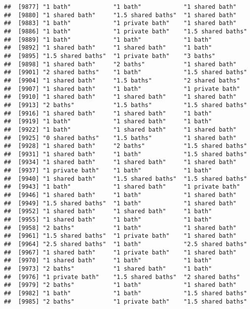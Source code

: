 \documentclass[
]{article}
\begin{document}
\begin{verbatim}
##  [9877] "1 bath"            "1 bath"            "1 shared bath"    
##  [9880] "1 shared bath"     "1.5 shared baths"  "1 shared bath"    
##  [9883] "1 bath"            "1 private bath"    "1 shared bath"    
##  [9886] "1 bath"            "1 private bath"    "1.5 shared baths" 
##  [9889] "1 bath"            "1 bath"            "1 bath"           
##  [9892] "1 shared bath"     "1 shared bath"     "1 bath"           
##  [9895] "1.5 shared baths"  "1 private bath"    "3 baths"          
##  [9898] "1 shared bath"     "2 baths"           "1 shared bath"    
##  [9901] "2 shared baths"    "1 bath"            "1.5 shared baths" 
##  [9904] "1 shared bath"     "1.5 baths"         "2 shared baths"   
##  [9907] "1 shared bath"     "1 bath"            "1 private bath"   
##  [9910] "1 shared bath"     "1 shared bath"     "1 shared bath"    
##  [9913] "2 baths"           "1.5 baths"         "1.5 shared baths" 
##  [9916] "1 shared bath"     "1 shared bath"     "1 bath"           
##  [9919] "1 bath"            "1 shared bath"     "1 bath"           
##  [9922] "1 bath"            "1 shared bath"     "1 shared bath"    
##  [9925] "0 shared baths"    "1.5 baths"         "1 shared bath"    
##  [9928] "1 shared bath"     "2 baths"           "1.5 shared baths" 
##  [9931] "1 shared bath"     "1 bath"            "1.5 shared baths" 
##  [9934] "1 shared bath"     "1 shared bath"     "1 shared bath"    
##  [9937] "1 private bath"    "1 bath"            "1 bath"           
##  [9940] "1 shared bath"     "1.5 shared baths"  "1.5 shared baths" 
##  [9943] "1 bath"            "1 shared bath"     "1 private bath"   
##  [9946] "1 shared bath"     "1 bath"            "1 shared bath"    
##  [9949] "1.5 shared baths"  "1 bath"            "1 shared bath"    
##  [9952] "1 shared bath"     "1 shared bath"     "1 bath"           
##  [9955] "1 shared bath"     "1 bath"            "1 bath"           
##  [9958] "2 baths"           "1 bath"            "1 shared bath"    
##  [9961] "1.5 shared baths"  "1 private bath"    "1 shared bath"    
##  [9964] "2.5 shared baths"  "1 bath"            "2.5 shared baths" 
##  [9967] "1 shared bath"     "1 private bath"    "1 shared bath"    
##  [9970] "1 shared bath"     "1 bath"            "1 bath"           
##  [9973] "2 baths"           "1 shared bath"     "1 bath"           
##  [9976] "1 private bath"    "1.5 shared baths"  "2 shared baths"   
##  [9979] "2 baths"           "1 bath"            "1 shared bath"    
##  [9982] "1 bath"            "1 bath"            "1.5 shared baths" 
##  [9985] "2 baths"           "1 private bath"    "1.5 shared baths" 

\end{verbatim}
\end{document}
